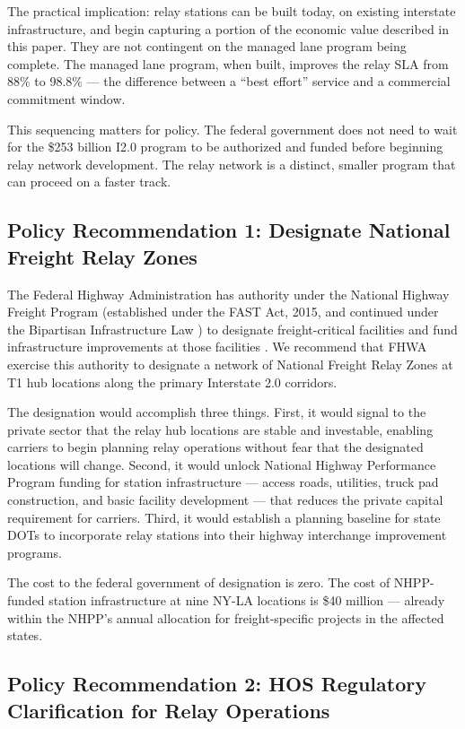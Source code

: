 The practical implication: relay stations can be built today, on existing interstate
infrastructure, and begin capturing a portion of the economic value described in this paper.
They are not contingent on the managed lane program being complete. The managed lane program,
when built, improves the relay SLA from 88\% to 98.8\% --- the difference between
a ``best effort'' service and a commercial commitment window.

This sequencing matters for policy. The federal government does not need to wait for the
\$253 billion I2.0 program to be authorized and funded before beginning relay network
development. The relay network is a distinct, smaller program that can proceed on a
faster track.

\subsection{Policy Recommendation 1: Designate National Freight Relay Zones}

The Federal Highway Administration has authority under the National Highway Freight
Program (established under the FAST Act, 2015, and continued under the Bipartisan Infrastructure Law \citep{IIJA2021}) to
designate freight-critical facilities and fund infrastructure improvements at those
facilities \citep{FHWA_freight2023}. We recommend that FHWA exercise this authority
to designate a network of National Freight Relay Zones at T1 hub locations along
the primary Interstate 2.0 corridors.

The designation would accomplish three things. First, it would signal to the private
sector that the relay hub locations are stable and investable, enabling carriers to
begin planning relay operations without fear that the designated locations will change.
Second, it would unlock National Highway Performance Program funding for station
infrastructure --- access roads, utilities, truck pad construction, and basic facility
development --- that reduces the private capital requirement for carriers. Third, it
would establish a planning baseline for state DOTs to incorporate relay stations into
their highway interchange improvement programs.

The cost to the federal government of designation is zero. The cost of NHPP-funded
station infrastructure at nine NY-LA locations is \$40 million --- already within the
NHPP's annual allocation for freight-specific projects in the affected states.

\subsection{Policy Recommendation 2: HOS Regulatory Clarification for Relay Operations}

